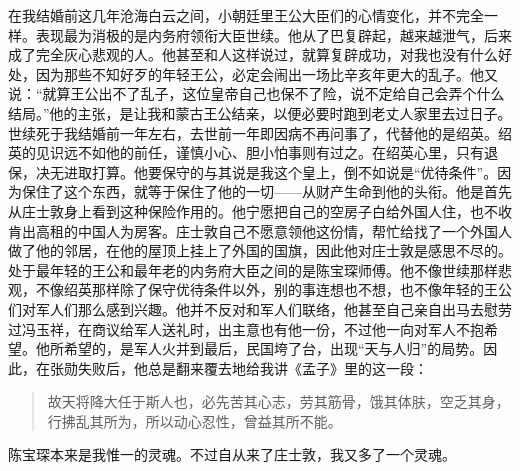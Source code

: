 在我结婚前这几年沧海白云之间，小朝廷里王公大臣们的心情变化，并不完全一样。表现最为消极的是内务府领衔大臣世续。他从了巴复辟起，越来越泄气，后来成了完全灰心悲观的人。他甚至和人这样说过，就算复辟成功，对我也没有什么好处，因为那些不知好歹的年轻王公，必定会闹出一场比辛亥年更大的乱子。他又说：“就算王公出不了乱子，这位皇帝自己也保不了险，说不定给自己会弄个什么结局。”他的主张，是让我和蒙古王公结亲，以便必要时跑到老丈人家里去过日子。世续死于我结婚前一年左右，去世前一年即因病不再问事了，代替他的是绍英。绍英的见识远不如他的前任，谨慎小心、胆小怕事则有过之。在绍英心里，只有退保，决无进取打算。他要保守的与其说是我这个皇上，倒不如说是“优待条件”。因为保住了这个东西，就等于保住了他的一切——从财产生命到他的头衔。他是首先从庄士敦身上看到这种保险作用的。他宁愿把自己的空房子白给外国人住，也不收肯出高租的中国人为房客。庄士敦自己不愿意领他这份情，帮忙给找了一个外国人做了他的邻居，在他的屋顶上挂上了外国的国旗，因此他对庄士敦是感思不尽的。\\

处于最年轻的王公和最年老的内务府大臣之间的是陈宝琛师傅。他不像世续那样悲观，不像绍英那样除了保守优待条件以外，别的事连想也不想，也不像年轻的王公们对军人们那么感到兴趣。他并不反对和军人们联络，他甚至自己亲自出马去慰劳过冯玉祥，在商议给军人送礼时，出主意也有他一份，不过他一向对军人不抱希望。他所希望的，是军人火并到最后，民国垮了台，出现“天与人归”的局势。因此，在张勋失败后，他总是翻来覆去地给我讲《孟子》里的这一段：\\

\begin{quote}
	故天将降大任于斯人也，必先苦其心志，劳其筋骨，饿其体肤，空乏其身，行拂乱其所为，所以动心忍性，曾益其所不能。
\end{quote}

陈宝琛本来是我惟一的灵魂。不过自从来了庄士敦，我又多了一个灵魂。\\